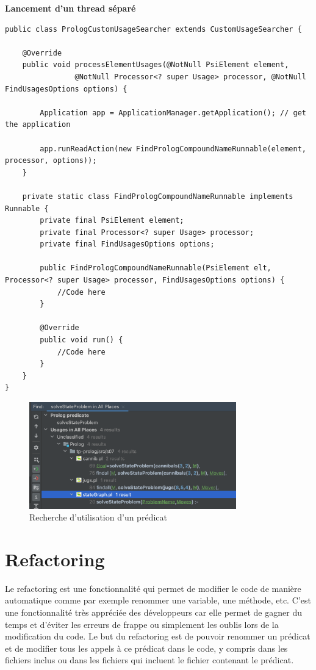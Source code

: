 \noindent \textbf{Lancement d'un thread séparé}
\begin{lstlisting}[label={lst:method_find_usages}, caption={Lancement d'un thread séparé}]
public class PrologCustomUsageSearcher extends CustomUsageSearcher {

    @Override
    public void processElementUsages(@NotNull PsiElement element,
                @NotNull Processor<? super Usage> processor, @NotNull FindUsagesOptions options) {

        Application app = ApplicationManager.getApplication(); // get the application

        app.runReadAction(new FindPrologCompoundNameRunnable(element, processor, options));
    }

    private static class FindPrologCompoundNameRunnable implements Runnable {
        private final PsiElement element;
        private final Processor<? super Usage> processor;
        private final FindUsagesOptions options;

        public FindPrologCompoundNameRunnable(PsiElement elt, Processor<? super Usage> processor, FindUsagesOptions options) {
            //Code here
        }

        @Override
        public void run() {
            //Code here
        }
    }
}
\end{lstlisting}

\begin{figure}[H]
    \centering
    \includegraphics[width=0.8\textwidth]{images/Find_Usage.png}
    \caption{Recherche d'utilisation d'un prédicat}
    \label{fig:usage}
\end{figure}

\section{Refactoring}
\noindent Le refactoring est une fonctionnalité qui permet de modifier le code de manière automatique comme par exemple renommer une variable, une méthode, etc.
C'est une fonctionnalité très appréciée des développeurs car elle permet de gagner du temps et d'éviter les erreurs de frappe ou simplement les oublis lors de la modification du code.
\newdoubleline
Le but du refactoring est de pouvoir renommer un prédicat et de modifier tous les appels à ce prédicat dans le code, y compris dans les fichiers inclus ou dans les fichiers qui incluent le fichier contenant le prédicat.

